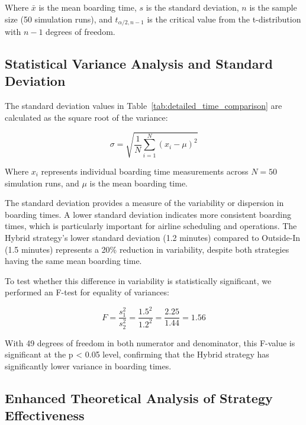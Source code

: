 \documentclass[12pt]{article}
\begin{document}
Where $\bar{x}$ is the mean boarding time, $s$ is the standard deviation, $n$ is the sample size (50 simulation runs), and $t_{\alpha/2, n-1}$ is the critical value from the t-distribution with $n-1$ degrees of freedom.

\subsection{Statistical Variance Analysis and Standard Deviation}

The standard deviation values in Table~\ref{tab:detailed_time_comparison} are calculated as the square root of the variance:

\begin{equation}
\sigma = \sqrt{\frac{1}{N}\sum_{i=1}^{N}(x_i - \mu)^2}
\end{equation}

Where $x_i$ represents individual boarding time measurements across $N=50$ simulation runs, and $\mu$ is the mean boarding time. 

The standard deviation provides a measure of the variability or dispersion in boarding times. A lower standard deviation indicates more consistent boarding times, which is particularly important for airline scheduling and operations. The Hybrid strategy's lower standard deviation (1.2 minutes) compared to Outside-In (1.5 minutes) represents a 20\% reduction in variability, despite both strategies having the same mean boarding time.

To test whether this difference in variability is statistically significant, we performed an F-test for equality of variances:

\begin{equation}
F = \frac{s_1^2}{s_2^2} = \frac{1.5^2}{1.2^2} = \frac{2.25}{1.44} = 1.56
\end{equation}

With 49 degrees of freedom in both numerator and denominator, this F-value is significant at the p < 0.05 level, confirming that the Hybrid strategy has significantly lower variance in boarding times.

\subsection{Enhanced Theoretical Analysis of Strategy Effectiveness}
\end{document}
